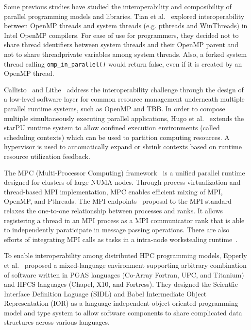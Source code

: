 Some previous studies have studied the interoperability and composibility of parallel programming models and libraries. 
Tian et al.~\cite{tian2003compiler} explored interoperability between OpenMP threads and system threads (e.g. pthreads and WinThreads) in Intel OpenMP compilers.
For ease of use for programmers, they decided not to share thread identifiers between system threads and their OpenMP parent
and not to share threadprivate variables among system threads.
Also, a forked system thread calling \lstinline{omp_in_parallel()} would return false, even if it is created by an OpenMP thread. 

Callisto~\cite{Callisto:Harris:2014:CCP:2592798.2592807} and
Lithe~\cite{Lithe:Pan:2009:LEE:1855591.1855602} 
address the interoperability challenge 
through the design of a low-level software layer for common 
resource management underneath multiple parallel runtime systems, such as OpenMP and TBB. %
In order to compose multiple simultaneously executing parallel applications, Hugo et al.~\cite{hugo2014composing} extends the starPU runtime system to allow confined execution environments (called scheduling contexts) which can be used to partition computing resources. 
A hypervisor is used to automatically expand or shrink contexts based on runtime resource utilization feedback. 

The MPC (Multi-Processor Computing) framework~\cite{perache2008mpc} is a unified parallel runtime designed for clusters of large NUMA nodes. 
Through process virtualization and thread-based MPI implementation, MPC enables efficient mixing of MPI, OpenMP, and Pthreads. 
The MPI endpoints~\cite{Dinan:mpiendpoint_eurompi13}
proposal to the MPI standard relaxes the one-to-one relationship between processes and ranks.
It allows registering a thread in an MPI
process as a MPI communicator rank that is able to independently paraticipate
in message passing operations. There are also efforts of integrating MPI calls as
tasks in a intra-node workstealing runtime~\cite{hcmpi:ipdps13}.

To enable interoperability among distributed HPC programming models, Epperly et al.~\cite{epperly2011composite} proposed a mixed-language environment supporting arbitrary combination of software written in PGAS languages (Co-Array Fortran, UPC, and Titanium) and HPCS languages (Chapel, X10, and Fortress). 
They designed the Scientfic Interface Definition Laguage (SIDL) and Babel Intermediate Object Representation (IOR) as a language-independent object-oriented programming model and type system
to allow software components to share complicated data structures across various languages. 
